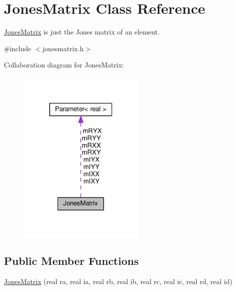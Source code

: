 \hypertarget{classJonesMatrix}{}\section{Jones\+Matrix Class Reference}
\label{classJonesMatrix}


\hyperlink{classJonesMatrix}{Jones\+Matrix} is just the Jones matrix of an element.  




{\ttfamily \#include $<$jonesmatrix.\+h$>$}



Collaboration diagram for Jones\+Matrix\+:
\nopagebreak
\begin{figure}[H]
\begin{center}
\leavevmode
\includegraphics[width=175pt]{classJonesMatrix__coll__graph}
\end{center}
\end{figure}
\subsection*{Public Member Functions}
\begin{DoxyCompactItemize}
\item 
\hyperlink{classJonesMatrix_a7fc6346ea0046fe0424fac0401965014}{Jones\+Matrix} (real ra, real ia, real rb, real ib, real rc, real ic, real rd, real id)
\end{DoxyCompactItemize}
